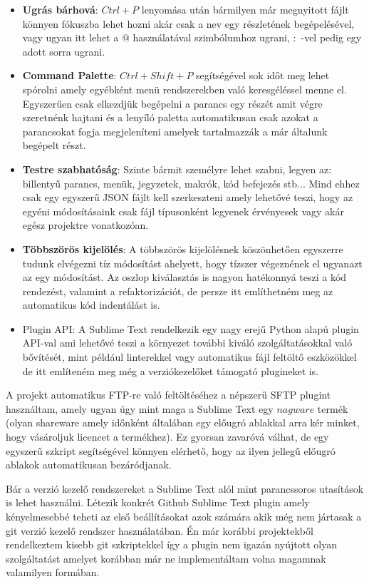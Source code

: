 \documentclass[12pt]{report}
\theoremstyle{definition}
\begin{document}
	\begin{itemize}
		\item \textbf{Ugrás bárhová}: $Ctrl+P$ lenyomása után bármilyen már megnyitott fájlt könnyen fókuszba lehet hozni akár csak a nev egy részletének begépelésével, vagy ugyan itt lehet a $@$ használatával szimbólumhoz ugrani, $:$ -vel pedig egy adott sorra ugrani.
		\item \textbf{Command Palette}: $Ctrl+Shift+P$ segítségével sok időt meg lehet spórolni amely egyébként menü rendszerekben való keresgéléssel menne el. Egyszerűen csak elkezdjük begépelni a parancs egy részét amit végre szeretnénk hajtani és a lenyíló paletta automatikusan csak azokat a parancsokat fogja megjeleníteni amelyek tartalmazzák a már általunk begépelt részt.
		\item \textbf{Testre szabhatóság}: Szinte bármit személyre lehet szabni, legyen az: billentyű parancs, menük, jegyzetek, makrók, kód befejezés stb... Mind ehhez csak egy egyszerű JSON fájlt kell szerkeszteni amely lehetővé teszi, hogy az egyéni módosításaink csak fájl típusonként legyenek érvényesek vagy akár egész projektre vonatkozóan.
		\item \textbf{Többszörös kijelölés}: A többszörös kijelölésnek köszönhetően egyszerre tudunk elvégezni tíz módosítást ahelyett, hogy tízszer végeznének el ugyanazt az egy módosítást. Az oszlop kiválasztás is nagyon hatékonnyá teszi a kód rendezést, valamint a refaktorizációt, de persze itt említhetném meg az automatikus kód indentálást is.
		\item {Plugin API}: A Sublime Text rendelkezik egy nagy erejű Python alapú plugin API-val ami lehetővé teszi a környezet további kiváló szolgáltatásokkal való bővítését, mint például linterekkel vagy automatikus fájl feltöltő eszközökkel de itt említeném meg még a verziókezelőket támogató plugineket is.
	\end{itemize}
	
	A projekt automatikus FTP-re való feltöltéséhez a népszerű SFTP plugint használtam, amely ugyan úgy mint maga a Sublime Text egy $nagware$ termék (olyan shareware amely időnként általában egy előugró ablakkal arra kér minket, hogy vásároljuk licencet a termékhez). Ez gyorsan zavaróvá válhat, de egy egyszerű szkript segítségével könnyen elérhető, hogy az ilyen jellegű előugró ablakok automatikusan bezáródjanak.
	
	Bár a verzió kezelő rendszereket a Sublime Text alól mint parancssoros utasítások is lehet használni. Létezik konkrét Github Sublime Text plugin amely kényelmesebbé teheti az első beállításokat azok számára akik még nem jártasak a git verzió kezelő rendszer használatában. Én már korábbi projektekből rendelkeztem kisebb git szkriptekkel így a plugin nem igazán nyújtott olyan szolgáltatást amelyet korábban már ne implementáltam volna magamnak valamilyen formában.
	
\end{document}
